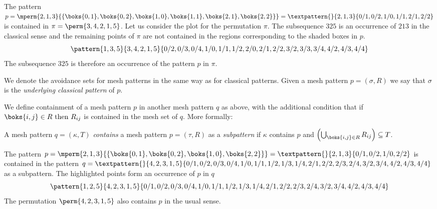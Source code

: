 \begin{example}
    The pattern \(p=\mperm{2,1,3}{\{\boks{0,1},\boks{0,2},\boks{1,0},\boks{1,1},\boks{2,1},\boks{2,2}\}}=
    \textpattern{}{ 2, 1, 3 }{ 0/1, 0/2, 1/0, 1/1, 2/1, 2/2 }\) is contained in
    \(\pi = \perm{3,4,2,1,5}\).
    Let us consider the plot for the permutation \(\pi\). The subsequence \(325\) is
    an occurrence of \(213\) in the classical sense and the remaining points of \(\pi\)
    are not contained in the regions corresponding to the shaded boxes in \(p\).
    \begin{equation*}
        \pattern{1,3,5}{3,4,2,1,5}{0/2,0/3,0/4,
                                   1/0,1/1,1/2,
                                   2/0,2/1,2/2,
                                   3/2,3/3,3/4,
                                   4/2,4/3,4/4}
    \end{equation*}
    The subsequence \(325\) is therefore an occurrence of the pattern \(p\) in \(\pi\).
\end{example}

We denote the avoidance sets for mesh patterns in the same way as for classical
patterns. Given a mesh pattern \(p=(\sigma,R)\) we say that \(\sigma\) is the
\emph{underlying classical pattern} of \(p\).

We define containment of a mesh pattern \(p\) in another mesh pattern \(q\) as
above, with the additional condition that if \(\boks{i,j}\in R\text{ then }
R_{ij}\) is contained in the mesh set of \(q\). More formally:

\begin{definition}
A mesh pattern \(q=(\kappa,T)\) \emph{contains} a mesh pattern \(p=(\tau,R)\) as
a \emph{subpattern} if \(\kappa\) contains \(p\) and
\(\left(\bigcup_{\boks{i,j}\in R} R_{ij}\right)\subseteq T\).
\end{definition}

\begin{example}
    The pattern \(p=\mperm{2,1,3}{\{\boks{0,1},\boks{0,2},\boks{1,0},\boks{2,2}\}}=
    \textpattern{}{ 2, 1, 3 }{ 0/1, 0/2, 1/0, 2/2 }\) is contained in the pattern
    \(q = \textpattern{}{4,2,3,1,5}{0/1,0/2,0/3,0/4,
                               1/0,1/1,1/2,1/3,1/4,
                               2/1,2/2,2/3,2/4,
                               3/2,3/4,
                               4/2,4/3,4/4} \) as a subpattern.
    The highlighted points form an occurrence of \(p\) in \(q\)
    \begin{equation*}
        \pattern{1,2,5}{4,2,3,1,5}{0/1,0/2,0/3,0/4,
                                   1/0,1/1,1/2,1/3,1/4,
                                   2/1,2/2,2/3,2/4,
                                   3/2,3/4,
                                   4/2,4/3,4/4}
    \end{equation*}
    The permutation \(\perm{4,2,3,1,5}\) also contains \(p\) in the usual sense.
\end{example}
